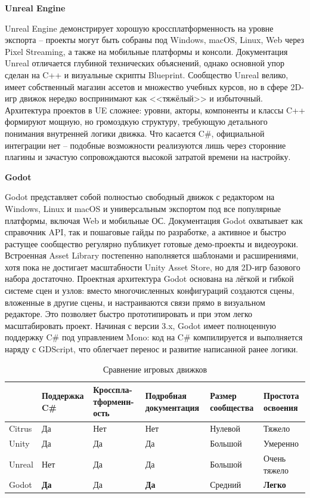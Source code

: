         \textbf{Unreal Engine}

        Unreal Engine демонстрирует хорошую кроссплатформенность на уровне экспорта -- проекты могут быть собраны под Windows, macOS, Linux, Web через Pixel Streaming, а также на мобильные платформы и консоли. Документация Unreal отличается глубиной технических объяснений, однако основной упор сделан на C++ и визуальные скрипты Blueprint. Сообщество Unreal велико, имеет собственный магазин ассетов и множество учебных курсов, но в сфере 2D-игр движок нередко воспринимают как <<тяжёлый>> и избыточный. Архитектура проектов в UE сложнее: уровни, акторы, компоненты и классы C++ формируют мощную, но громоздкую структуру, требующую детального понимания внутренней логики движка. Что касается C\#, официальной интеграции нет -- подобные возможности реализуются лишь через сторонние плагины и зачастую сопровождаются высокой затратой времени на настройку.
        
        \textbf{Godot}

        Godot представляет собой полностью свободный движок с редактором на Windows, Linux и macOS и универсальным экспортом под все популярные платформы, включая Web и мобильные ОС. Документация Godot охватывает как справочник API, так и пошаговые гайды по разработке, а активное и быстро растущее сообщество регулярно публикует готовые демо-проекты и видеоуроки. Встроенная Asset Library постепенно наполняется шаблонами и расширениями, хотя пока не достигает масштабности Unity Asset Store, но для 2D-игр базового набора достаточно. Проектная архитектура Godot основана на лёгкой и гибкой системе сцен и узлов: вместо многочисленных конфигураций создаются сцены, вложенные в другие сцены, и настраиваются связи прямо в визуальном редакторе. Это позволяет быстро прототипировать и при этом легко масштабировать проект. Начиная с версии 3.x, Godot имеет полноценную поддержку C\# под управлением Mono: код на C\# компилируется и выполняется наряду с GDScript, что облегчает перенос и развитие написанной ранее логики.

        \begin{table}[ht]
            \caption{Сравнение игровых движков}
            \centering
            \renewcommand{\arraystretch}{1.2}
            \renewcommand{\tablename}{Табл.}
            \begin{tabularx}{\textwidth}{|X|X|X|X|X|X|}
            \hline
            &\textbf{Поддержка C\#} & \textbf{Кросспла-тформенн-ость} & \textbf{Подробная документация} & \textbf{Размер сообщества} & \textbf{Простота освоения} \\
            \hline
            Citrus&Да&Нет&Нет& Нулевой&Тяжело\\
            \hline
            Unity&Да&Да&Да& Большой&Умеренно\\
            \hline
            Unreal&Нет&Да&Да&Большой&Очень тяжело\\
            \hline
            Godot&\textbf{Да}&Да&\textbf{Да}&Средний&\textbf{Легко}\\
            \hline
            \end{tabularx}
        \end{table}

